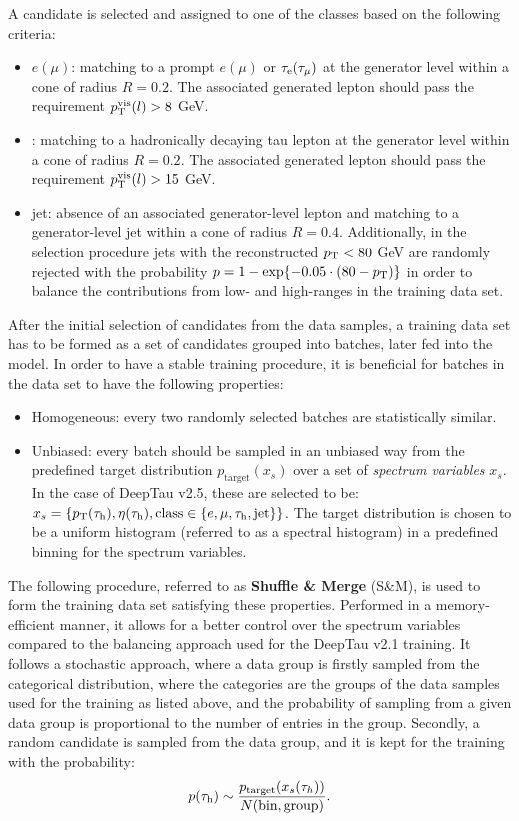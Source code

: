 A \tauh candidate is selected and assigned to one of the classes based on the following criteria:
\begin{itemize}
    \item $e (\mu)$: matching to a prompt $e (\mu)$ or $\tau_\mathrm{e} (\tau_\mu)$ at the generator level within a cone of radius $R=0.2$. The associated generated lepton should pass the requirement $p_{\text{T}}^{\text{vis}}(l)>8$ GeV.
    \item \tauh: matching to a hadronically decaying tau lepton at the generator level within a cone of radius $R=0.2$. The associated generated lepton should pass the requirement $p_{\text{T}}^{\text{vis}}(l)>15$ GeV.
    \item jet: absence of an associated generator-level lepton and matching to a generator-level jet within a cone of radius $R=0.4$. Additionally, in the selection procedure jets with the reconstructed $p_{\text{T}} < 80$ GeV are randomly rejected with the probability $p = 1 - \exp{-0.05\cdot(80-\ensuremath{p_{\text{T}}})}$ in order to balance the contributions from low- and high-\pt ranges in the training data set.
\end{itemize}

After the initial selection of \tauh candidates from the data samples, a training data set has to be formed as a set of \tauh candidates grouped into batches, later fed into the model. In order to have a stable training procedure, it is beneficial for batches in the data set to have the following properties:
\begin{itemize}
    \item Homogeneous: every two randomly selected batches are statistically similar. 
    \item Unbiased: every batch should be sampled in an unbiased way from the predefined target distribution $p_\text{target}(x_s)$ over a set of \textit{spectrum variables} $x_s$. In the case of DeepTau v2.5, these are selected to be: $x_s = \{p_{\text{T}}(\tau_\mathrm{h}), \eta(\tau_\mathrm{h}), \text{class} \in \{e, \mu, \tau_\mathrm{h}, \text{jet}\}\}$. The target distribution is chosen to be a uniform histogram (referred to as a spectral histogram) in a predefined binning for the spectrum variables. 
\end{itemize}

The following procedure, referred to as \textbf{Shuffle \& Merge} (S\&M), is used to form the training data set satisfying these properties. Performed in a memory-efficient manner, it allows for a better control over the spectrum variables compared to the balancing approach used for the DeepTau v2.1 training. It follows a stochastic approach, where a data group is firstly sampled from the categorical distribution, where the categories are the groups of the data samples used for the training as listed above, and the probability of sampling from a given data group is proportional to the number of entries in the group. Secondly, a random \tauh candidate is sampled from the data group, and it is kept for the training with the probability:
\begin{equation}
    p(\tau_\mathrm{h}) \sim \dfrac{p_\text{target}(x_s(\tau_h))}{N(\text{bin},\text{group})}.
\end{equation}

